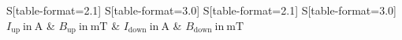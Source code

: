 \begin{table}
    \centering
    \caption{Strom und Magnetfeld beim Hoch- und Runterregeln des Magnetfelds}
    \label{tab:Messwerte}
    \begin{tabular}{
	S[table-format=2.1]
	S[table-format=3.0]
	S[table-format=2.1]
	S[table-format=3.0]
	}
	\toprule
	{$I_\mathrm{up} \ \mathrm{in} \ \si{\ampere}$}		& {$B_\mathrm{up} \ \mathrm{in} \ \si{\milli\tesla}$}		& 
	{$I_\mathrm{down} \ \mathrm{in} \ \si{\ampere}$}		& {$B_\mathrm{down} \ \mathrm{in} \ \si{\milli\tesla}$}		\\ 
	\midrule
    
    \bottomrule
    \end{tabular}
    \end{table}
